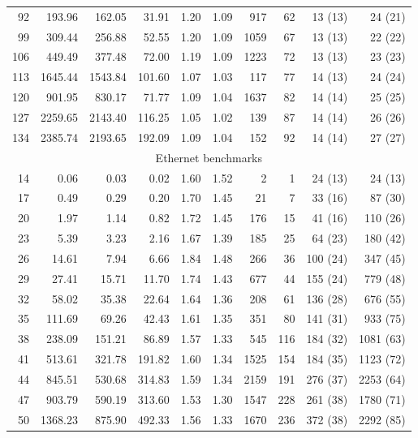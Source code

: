 \begin{table}[t]
{\begin{tabular}{r r r r r r r r r r}
92 & 193.96 & 162.05 & 31.91 & 1.20 & 1.09 & 917      & 62  & 13 (13) & 24 (21)  \\
99 & 309.44 & 256.88 & 52.55 & 1.20 & 1.09 & 1059     & 67  & 13 (13) & 22 (22)  \\
106 & 449.49 & 377.48 & 72.00 & 1.19 & 1.09 & 1223    & 72  & 13 (13) & 23 (23)  \\
113 & 1645.44 & 1543.84 & 101.60 & 1.07 & 1.03 & 117  & 77  & 14 (13) & 24 (24)  \\
120 & 901.95 & 830.17 & 71.77 & 1.09 & 1.04 & 1637    & 82  & 14 (14) & 25 (25)  \\
127 & 2259.65 & 2143.40 & 116.25 & 1.05 & 1.02 & 139  & 87  & 14 (14) & 26 (26)  \\
134 & 2385.74 & 2193.65 & 192.09 & 1.09 & 1.04 & 152  & 92  & 14 (14) & 27 (27)  \\
\hline
\multicolumn{10}{c}{Ethernet benchmarks} \\
\hline
14 & 0.06 & 0.03 & 0.02 & 1.60 & 1.52 & 2             & 1    & 24 (13)  & 24 (13)    \\
17 & 0.49 & 0.29 & 0.20 & 1.70 & 1.45 & 21            & 7    & 33 (16)  & 87 (30)    \\
20 & 1.97 & 1.14 & 0.82 & 1.72 & 1.45 & 176           & 15   & 41 (16)  & 110 (26)   \\
23 & 5.39 & 3.23 & 2.16 & 1.67 & 1.39 & 185           & 25   & 64 (23)  & 180 (42)   \\
26 & 14.61 & 7.94 & 6.66 & 1.84 & 1.48 & 266          & 36   & 100 (24) & 347 (45)   \\
29 & 27.41 & 15.71 & 11.70 & 1.74 & 1.43 & 677        & 44   & 155 (24) & 779 (48)   \\
32 & 58.02 & 35.38 & 22.64 & 1.64 & 1.36 & 208        & 61   & 136 (28) & 676 (55)   \\
35 & 111.69 & 69.26 & 42.43 & 1.61 & 1.35 & 351       & 80   & 141 (31) & 933 (75)   \\
38 & 238.09 & 151.21 & 86.89 & 1.57 & 1.33 & 545      & 116  & 184 (32) & 1081 (63)  \\
41 & 513.61 & 321.78 & 191.82 & 1.60 & 1.34 & 1525    & 154  & 184 (35) & 1123 (72)  \\
44 & 845.51 & 530.68 & 314.83 & 1.59 & 1.34 & 2159    & 191  & 276 (37) & 2253 (64)  \\
47 & 903.79 & 590.19 & 313.60 & 1.53 & 1.30 & 1547    & 228  & 261 (38) & 1780 (71)  \\
50 & 1368.23 & 875.90 & 492.33 & 1.56 & 1.33 & 1670   & 236  & 372 (38) & 2292 (85)  \\

\end{tabular}}
\end{table}
